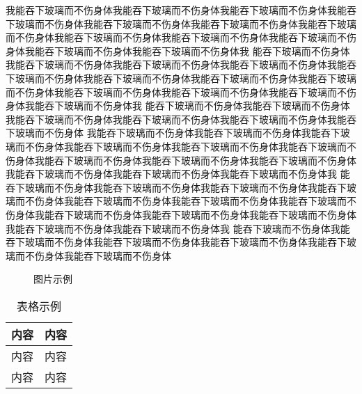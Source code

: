 \documentclass[a4paper,UTF8]{ctexart}
\begin{document}
我能吞下玻璃而不伤身体我能吞下玻璃而不伤身体我能吞下玻璃而不伤身体我能吞下玻璃而不伤身体我能吞下玻璃而不伤身体我能吞下玻璃而不伤身体我能吞下玻璃而不伤身体我能吞下玻璃而不伤身体我能吞下玻璃而不伤身体我能吞下玻璃而不伤身体我能吞下玻璃而不伤身体我能吞下玻璃而不伤身体我
能吞下玻璃而不伤身体我能吞下玻璃而不伤身体我能吞下玻璃而不伤身体我能吞下玻璃而不伤身体我能吞下玻璃而不伤身体我能吞下玻璃而不伤身体我能吞下玻璃而不伤身体我能吞下玻璃而不伤身体我能吞下玻璃而不伤身体我能吞下玻璃而不伤身体我能吞下玻璃而不伤身体我能吞下玻璃而不伤身体我
能吞下玻璃而不伤身体我能吞下玻璃而不伤身体我能吞下玻璃而不伤身体我能吞下玻璃而不伤身体我能吞下玻璃而不伤身体我能吞下玻璃而不伤身体
我能吞下玻璃而不伤身体我能吞下玻璃而不伤身体我能吞下玻璃而不伤身体我能吞下玻璃而不伤身体我能吞下玻璃而不伤身体我能吞下玻璃而不伤身体我能吞下玻璃而不伤身体我能吞下玻璃而不伤身体我能吞下玻璃而不伤身体我能吞下玻璃而不伤身体我能吞下玻璃而不伤身体我能吞下玻璃而不伤身体我
能吞下玻璃而不伤身体我能吞下玻璃而不伤身体我能吞下玻璃而不伤身体我能吞下玻璃而不伤身体我能吞下玻璃而不伤身体我能吞下玻璃而不伤身体我能吞下玻璃而不伤身体我能吞下玻璃而不伤身体我能吞下玻璃而不伤身体我能吞下玻璃而不伤身体我能吞下玻璃而不伤身体我能吞下玻璃而不伤身体我
能吞下玻璃而不伤身体我能吞下玻璃而不伤身体我能吞下玻璃而不伤身体我能吞下玻璃而不伤身体我能吞下玻璃而不伤身体我能吞下玻璃而不伤身体
















\begin{figure}[htbp]
  \centering
  \caption{图片示例}
\end{figure}

\begin{table}[htbp]
  \centering
  \caption{表格示例}
  \begin{tabular}{c c}
    \hline
    内容 & 内容 \\
    \hline
    内容 & 内容 \\
    内容 & 内容 \\
    \hline
  \end{tabular}
\end{table}









\end{document}
